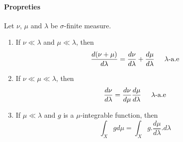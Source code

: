 \documentclass[a4paper,10pt]{article}
\begin{document}
\paragraph{Propreties }
 Let $\nu$, $\mu$ and $\lambda$ be $\sigma$-finite measure.
\begin{enumerate}
 \item If $\nu \ll \lambda$ and $\mu \ll \lambda$, then
\[
\frac{d(\nu+\mu)}{d\lambda} = \frac{d\nu}{d\lambda} + \frac{d\mu}{d\lambda} \hspace{5mm} \lambda\text{-a.e}
\] 
 \item If $\nu \ll \mu \ll \lambda$, then
\[
\frac{d\nu}{d\lambda} = \frac{d\nu}{d\mu} \frac{d\mu}{d\lambda} \hspace{5mm} \lambda\text{-a.e}
\]
 \item If $\mu \ll \lambda$ and $g$ is a $\mu$-integrable function, then
\[
\int_{X} gd\mu = \int_{X} g .\frac{d\mu}{d\lambda} .d\lambda
\] 
\end{enumerate}
\end{document}
